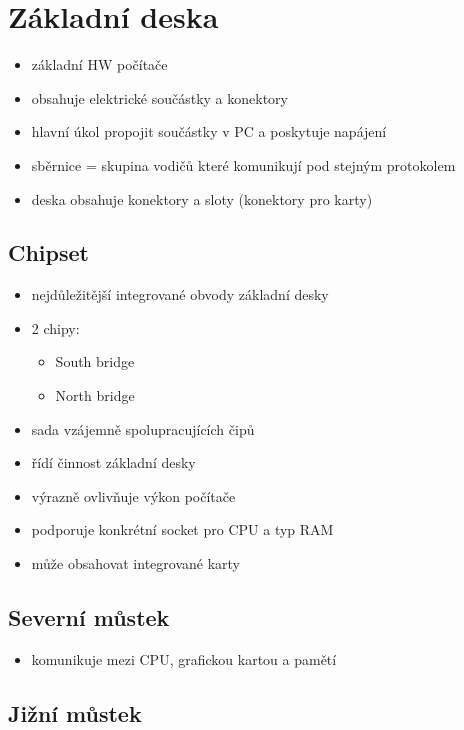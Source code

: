 \documentclass[a4paper,12pt]{article}
\begin{document}
\section{Základní deska}

\begin{itemize}
  \item základní HW počítače
  \item obsahuje elektrické součástky a konektory
  \item hlavní úkol propojit součástky v PC a poskytuje napájení
  \item sběrnice = skupina vodičů které komunikují pod stejným protokolem
  \item deska obsahuje konektory a sloty (konektory pro karty)
\end{itemize}


\subsection{Chipset}

\begin{itemize}
  \item nejdůležitější integrované obvody základní desky
  \item 2 chipy:
  \begin{itemize}
    \item South bridge
    \item North bridge
  \end{itemize}
  \item sada vzájemně spolupracujících čipů
  \item řídí činnost základní desky
  \item výrazně ovlivňuje výkon počítače
  \item podporuje konkrétní socket pro CPU a typ RAM
  \item může obsahovat integrované karty
\end{itemize}

\subsection{Severní můstek}

\begin{itemize}
  \item komunikuje mezi CPU, grafickou kartou a pamětí
\end{itemize}

\subsection{Jižní můstek}
\end{document}
